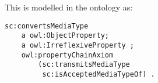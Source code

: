 This is modelled in the ontology as:
\begin{verbatim}
sc:convertsMediaType
	a owl:ObjectProperty; 
	a owl:IrreflexiveProperty ;
    owl:propertyChainAxiom
    	(sc:transmitsMediaType 
		 sc:isAcceptedMediaTypeOf) .
\end{verbatim}

% 
% 
% 
% 

